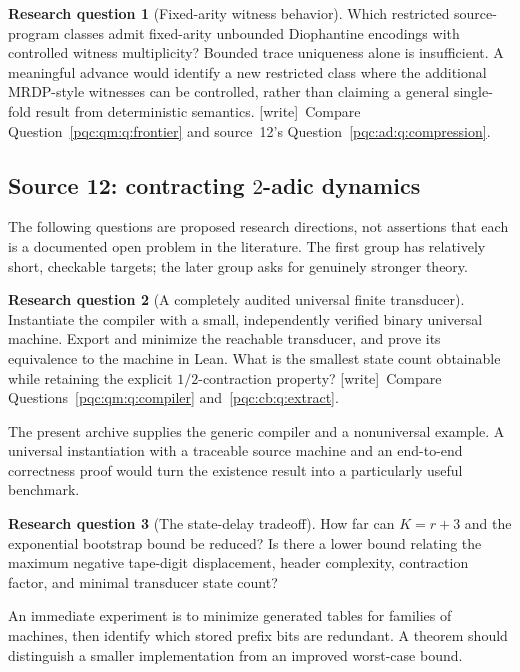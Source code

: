 \documentclass[11pt,letterpaper]{article}
\numberwithin{equation}{section}
\theoremstyle{definition}
\newtheorem{question}{Research question}
\theoremstyle{remark}
\newcommand{\wtag}{\textup{[write]}}
\begin{document}
\begin{question}[Fixed-arity witness behavior]
Which restricted source-program classes admit fixed-arity unbounded
Diophantine encodings with controlled witness multiplicity? Bounded trace
uniqueness alone is insufficient. A meaningful advance would identify a
new restricted class where the additional MRDP-style witnesses can be
controlled, rather than claiming a general single-fold result from
deterministic semantics.
\wtag\ Compare Question~\ref{pqc:qm:q:frontier} and source~12's Question~\ref{pqc:ad:q:compression}.
\end{question}

\subsection{Source 12: contracting \texorpdfstring{$2$}{2}-adic dynamics}\label{pqc:ad:sec:questions}

The following questions are proposed research directions, not assertions
that each is a documented open problem in the literature. The first group
has relatively short, checkable targets; the later group asks for genuinely
stronger theory.

\begin{question}[A completely audited universal finite transducer]\label{pqc:ad:q:transducer}
Instantiate the compiler with a small, independently verified binary
universal machine. Export and minimize the reachable transducer, and prove
its equivalence to the machine in Lean. What is the smallest state count
obtainable while retaining the explicit $1/2$-contraction property?
\wtag\ Compare Questions~\ref{pqc:qm:q:compiler} and~\ref{pqc:cb:q:extract}.
\end{question}
The present archive supplies the generic compiler and a nonuniversal
example. A universal instantiation with a traceable source machine and an
end-to-end correctness proof would turn the existence result into a
particularly useful benchmark.

\begin{question}[The state-delay tradeoff]
How far can $K=r+3$ and the exponential bootstrap bound be reduced? Is
there a lower bound relating the maximum negative tape-digit displacement,
header complexity, contraction factor, and minimal transducer state count?
\end{question}
An immediate experiment is to minimize generated tables for families of
machines, then identify which stored prefix bits are redundant. A theorem
should distinguish a smaller implementation from an improved worst-case
bound.
\end{document}
